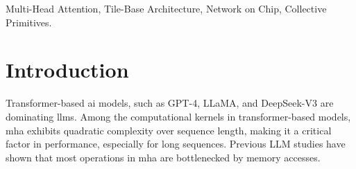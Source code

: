 \documentclass[conference]{IEEEtran}
\begin{document}
\maketitle

\begin{abstract}
Multi-Head Attention (MHA) is a critical computational kernel in transformer-based AI models.
Emerging scalable tile-based accelerator architectures integrate increasing numbers of tightly-packed processing elements (PEs) with tensor units. MHA dataflow mapping is crucial for achieving high utilization of the available units.
We propose FlatAttention, a new dataflow for MHA on tile-based many-PE accelerators, minimizing costly main memory (HBM) accesses by leveraging collective
primitives integrated into the on-chip network fabric. FlatAttention achieves up to \MaxUti\% utilization, and \OptFlatPerfSU\texttimes\ performance speedup over FlashAttention-3 dataflow on tile-based accelerators whilst reducing HBM traffic by \OptFlatHBMTraficSave\texttimes.
Through algorithm-architecture co-exploration, we identify an optimal configuration for a large scaled-out tile-based accelerator featuring a 32×32 tile mesh with 1024 TFLOPS @ FP16 peak performance, comparable to the state-of-the-art Nvidia H100 GPU.
FlatAttention in this configuration achieves up to \SUtoNV× higher utilization over FlashAttention-3 on the H100 GPU.  
Meanwhile, this tile-based accelerator configuration requires \BWreducetoNV\% less HBM bandwidth compared to the H100 GPU, enabling a \DieSave× reduction in die size, estimated on the same technology node.

\end{abstract}

\begin{IEEEkeywords}
Multi-Head Attention, Tile-Base Architecture, Network on Chip, Collective Primitives.
\end{IEEEkeywords}

\section{Introduction}
\label{sec:into}

Transformer-based \gls{ai} models, such as GPT-4, LLaMA, and DeepSeek-V3 are dominating \glspl{llm}. 
Among the computational kernels in transformer-based models, \gls{mha} exhibits quadratic complexity over sequence length\cite{keles2023computational}, making it a critical factor in performance, especially for long sequences.
Previous LLM studies \cite{yuan2024llm, ivanov2021data} have shown that most operations in \gls{mha} are bottlenecked by memory accesses.
\end{document}
